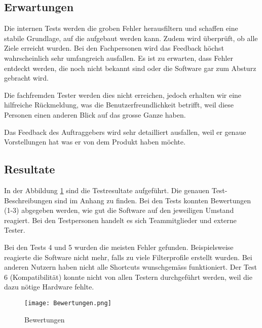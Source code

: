 \subsection{Erwartungen} \label{subsec:validierung}
Die internen Tests werden die groben Fehler herausfiltern und schaffen eine stabile Grundlage, auf die aufgebaut werden kann. Zudem wird überprüft, ob alle Ziele erreicht wurden.
Bei den Fachpersonen wird das Feedback höchst wahrscheinlich sehr umfangreich ausfallen. Es ist zu erwarten, dass Fehler entdeckt werden, die noch nicht bekannt sind oder die Software gar zum Absturz gebracht wird. 

Die fachfremden Tester werden dies nicht erreichen, jedoch erhalten wir eine hilfreiche Rückmeldung, was die Benutzerfreundlichkeit betrifft, weil diese Personen einen anderen Blick auf das grosse Ganze haben. 

Das Feedback des Auftraggebers wird sehr detailliert ausfallen, weil er genaue Vorstellungen hat was er von dem Produkt haben möchte.

\subsection{Resultate} \label{subsec:validierung}

In der Abbildung \ref{fig:Bewertungen} sind die Testresultate aufgeführt. Die genauen Test-Beschreibungen sind im Anhang zu finden. Bei den Tests konnten Bewertungen (1-3) abgegeben werden, wie gut die Software auf den jeweiligen Umstand reagiert. Bei den Testpersonen handelt es sich Teammitglieder und externe Tester. 

Bei den Tests 4 und 5 wurden die meisten Fehler gefunden. Beispielsweise reagierte die Software nicht mehr, falls zu viele Filterprofile erstellt wurden. Bei anderen Nutzern haben nicht alle Shortcuts wunschgemäss funktioniert. Der Test 6 (Kompatibilität) konnte nicht von allen Testern durchgeführt werden, weil die dazu nötige Hardware fehlte.           

\begin{figure}[H]
	\centering
	\texttt{[image: Bewertungen.png]}
	\caption{Bewertungen}
	\label{fig:Bewertungen}
\end{figure}